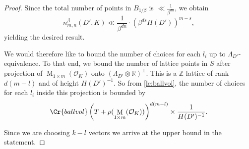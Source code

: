 \documentclass{amsart}
\theoremstyle{definition}
\theoremstyle{remark}
\newcommand{\OK}{\mathcal{O}_K}
\DeclareMathOperator{\M}{M}
\begin{document}
\begin{proof}
        Since the total number of points in $B_{1/\beta}$ is $\ll\tfrac{1}{\beta^{dn}}$, we obtain
        $$n^{\beta}_{m,n}(D',K)\ll\frac{1}{\beta^{dn}}\cdot(\beta^{ds}H(D'))^{m-s}, $$
        yielding the desired result.
    \fi 

    We would therefore like to bound the number of choices for each $l_i$ up to $\Lambda_{D'}$-equivalence. To that end, we bound the number of lattice points in $S$ after projection of $\M_{1 \times m}(\OK)$ 
    onto $(\Lambda_{D'} \otimes \mathbb{R})^\perp$. 
    This is a $\mathbb{Z}$-lattice of rank $d(m-l)$ and of height $H(D')^{-1}$.
    So from \cref{le:ballvol}, the number of choices for each $l_i$
    inside this projection is bounded by $$ \Cr{ballvol}\left(T+ \rho(\M_{1 \times m}(\OK))  \right)^{d(m-l)} \times \frac{1}{H(D')^{-1}}.$$

    Since we are choosing $k-l$ vectors we arrive at the upper bound in the statement.
\end{proof}
\end{document}
